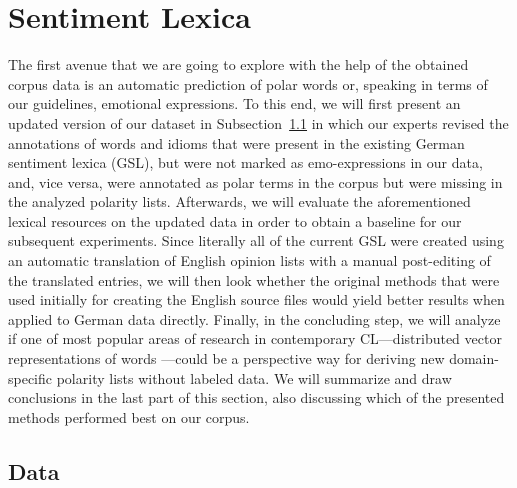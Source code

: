 

\section{Sentiment Lexica}\label{sec:snt:lex}

The first avenue that we are going to explore with the help of the
obtained corpus data is an automatic prediction of polar words or,
speaking in terms of our guidelines, emotional expressions.  To this
end, we will first present an updated version of our dataset in
Subsection~\ref{subsec:snt-lex:data} in which our experts revised the
annotations of words and idioms that were present in the existing
German sentiment lexica (GSL), but were not marked as emo-expressions
in our data, and, vice versa, were annotated as polar terms in the
corpus but were missing in the analyzed polarity lists.  Afterwards,
we will evaluate the aforementioned lexical resources on the updated
data in order to obtain a baseline for our subsequent experiments.
Since literally all of the current GSL were created using an automatic
translation of English opinion lists with a manual post-editing of the
translated entries, we will then look whether the original methods
that were used initially for creating the English source files would
yield better results when applied to German data directly.  Finally,
in the concluding step, we will analyze if one of most popular areas
of research in contemporary CL---distributed vector representations of
words \cite{Mikolov:13}---could be a perspective way for deriving new
domain-specific polarity lists without labeled data.  We will
summarize and draw conclusions in the last part of this section, also
discussing which of the presented methods performed best on our
corpus.

\subsection{Data}\label{subsec:snt-lex:data}

